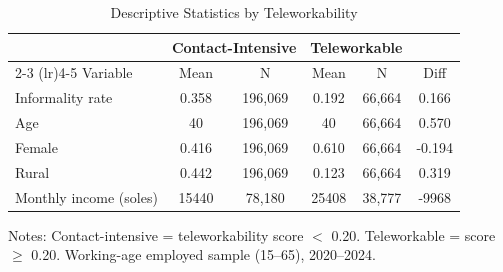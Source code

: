 \begin{table}[htbp]
\centering
\caption{Descriptive Statistics by Teleworkability}
\label{tab:descriptive}
\begin{tabular}{lccccc}
\toprule
 & \multicolumn{2}{c}{Contact-Intensive} & \multicolumn{2}{c}{Teleworkable} & \\
\cmidrule(lr){2-3} \cmidrule(lr){4-5}
Variable & Mean & N & Mean & N & Diff \\
\midrule
Informality rate & 0.358 & 196,069 & 0.192 & 66,664 & 0.166 \\
Age & 40 & 196,069 & 40 & 66,664 & 0.570 \\
Female & 0.416 & 196,069 & 0.610 & 66,664 & -0.194 \\
Rural & 0.442 & 196,069 & 0.123 & 66,664 & 0.319 \\
Monthly income (soles) & 15440 & 78,180 & 25408 & 38,777 & -9968 \\
\bottomrule
\end{tabular}
\begin{tablenotes}\small
\item Notes: Contact-intensive = teleworkability score $<$ 0.20. Teleworkable = score $\geq$ 0.20. Working-age employed sample (15--65), 2020--2024.
\end{tablenotes}
\end{table}
